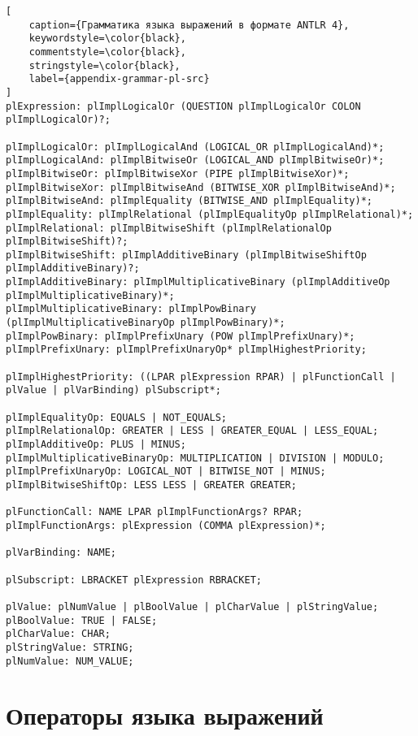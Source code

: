 \documentclass[times,specification,annotation]{style/itmo-student-thesis/itmo-student-thesis}
\begin{document}
\begin{lstlisting}[
    caption={Грамматика языка выражений в формате ANTLR 4},
    keywordstyle=\color{black},
    commentstyle=\color{black},
    stringstyle=\color{black},
    label={appendix-grammar-pl-src}
]
plExpression: plImplLogicalOr (QUESTION plImplLogicalOr COLON plImplLogicalOr)?;

plImplLogicalOr: plImplLogicalAnd (LOGICAL_OR plImplLogicalAnd)*;
plImplLogicalAnd: plImplBitwiseOr (LOGICAL_AND plImplBitwiseOr)*;
plImplBitwiseOr: plImplBitwiseXor (PIPE plImplBitwiseXor)*;
plImplBitwiseXor: plImplBitwiseAnd (BITWISE_XOR plImplBitwiseAnd)*;
plImplBitwiseAnd: plImplEquality (BITWISE_AND plImplEquality)*;
plImplEquality: plImplRelational (plImplEqualityOp plImplRelational)*;
plImplRelational: plImplBitwiseShift (plImplRelationalOp plImplBitwiseShift)?;
plImplBitwiseShift: plImplAdditiveBinary (plImplBitwiseShiftOp plImplAdditiveBinary)?;
plImplAdditiveBinary: plImplMultiplicativeBinary (plImplAdditiveOp plImplMultiplicativeBinary)*;
plImplMultiplicativeBinary: plImplPowBinary (plImplMultiplicativeBinaryOp plImplPowBinary)*;
plImplPowBinary: plImplPrefixUnary (POW plImplPrefixUnary)*;
plImplPrefixUnary: plImplPrefixUnaryOp* plImplHighestPriority;

plImplHighestPriority: ((LPAR plExpression RPAR) | plFunctionCall | plValue | plVarBinding) plSubscript*;

plImplEqualityOp: EQUALS | NOT_EQUALS;
plImplRelationalOp: GREATER | LESS | GREATER_EQUAL | LESS_EQUAL;
plImplAdditiveOp: PLUS | MINUS;
plImplMultiplicativeBinaryOp: MULTIPLICATION | DIVISION | MODULO;
plImplPrefixUnaryOp: LOGICAL_NOT | BITWISE_NOT | MINUS;
plImplBitwiseShiftOp: LESS LESS | GREATER GREATER;

plFunctionCall: NAME LPAR plImplFunctionArgs? RPAR;
plImplFunctionArgs: plExpression (COMMA plExpression)*;

plVarBinding: NAME;

plSubscript: LBRACKET plExpression RBRACKET;

plValue: plNumValue | plBoolValue | plCharValue | plStringValue;
plBoolValue: TRUE | FALSE;
plCharValue: CHAR;
plStringValue: STRING;
plNumValue: NUM_VALUE;
\end{lstlisting}

\chapter{Операторы языка выражений}\label{appendix-pl-operators-priority}
\end{document}
